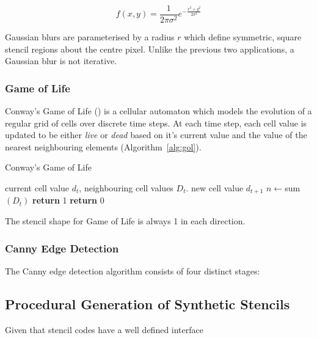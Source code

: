 \begin{equation}
f(x,y) = \frac{1}{2\pi\sigma^2}e^{-\frac{x^2 + y^2}{2\sigma^2}}
\end{equation}

Gaussian blurs are parameterised by a radius $r$ which define
symmetric, square stencil regions about the centre
pixel.  Unlike the
previous two applications, a Gaussian blur is not iterative.

\subsubsection{Game of Life}

Conway's Game of Life () is a cellular
automaton which models the evolution of a regular grid of cells over
discrete time steps. At each time step, each cell value is updated to
be either \emph{live} or \emph{dead} based on it's current value and
the value of the nearest neighbouring elements
(Algorithm~\ref{alg:gol}).

\begin{algorithm}[b]
\caption{Conway's Game of Life}
\label{alg:gol}
\begin{algorithmic}[1]
\Require current cell value $d_t$, neighbouring cell values $D_t$.
\Ensure new cell value $d_{t+1}$
\State $n \leftarrow $sum$(D_t)$
  \State \textbf{return} 1
\Else
  \State \textbf{return} 0
\EndIf
\end{algorithmic}
\end{algorithm}

The stencil shape for Game of Life is always 1 in each direction.

\subsubsection{Canny Edge Detection}

The Canny edge detection algorithm consists of four distinct stages:


\subsection{Procedural Generation of Synthetic Stencils}

Given that stencil codes have a well defined interface


